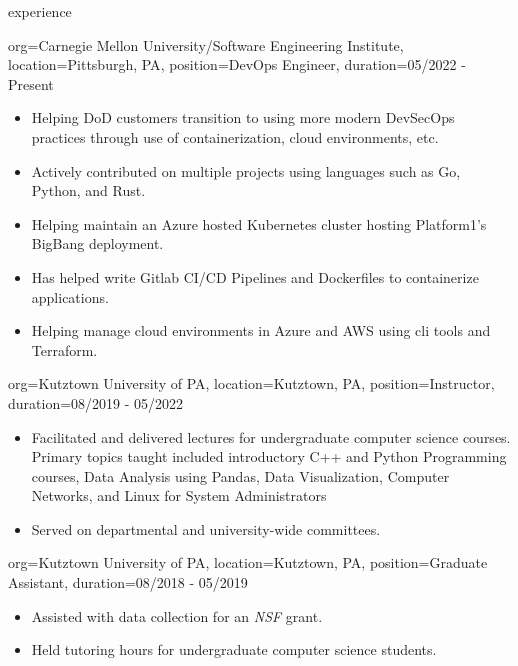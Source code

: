 \documentclass{resume}
\begin{document}
\makeheader

\begin{ResumeSection}{experience}
    \begin{ResumeSubsection}{org={Carnegie Mellon University/Software Engineering Institute}, location={Pittsburgh, PA}, position={DevOps Engineer}, duration={05/2022 - Present}}
        \begin{itemize}
            \item Helping DoD customers transition to using more modern DevSecOps practices through use of containerization, cloud environments, etc.
            \item Actively contributed on multiple projects using languages such as Go, Python, and Rust. 
            \item Helping maintain an Azure hosted Kubernetes cluster hosting Platform1's BigBang deployment. 
            \item Has helped write Gitlab CI/CD Pipelines and Dockerfiles to containerize applications.
            \item Helping manage cloud environments in Azure and AWS using cli tools and Terraform. 
        \end{itemize}
    \end{ResumeSubsection}
    \begin{ResumeSubsection}{org={Kutztown University of PA}, location={Kutztown, PA}, position={Instructor}, duration={08/2019 - 05/2022}}
        \begin{itemize}
            \item Facilitated and delivered lectures for undergraduate computer science courses. Primary topics taught included
            introductory C++ and Python Programming courses, Data Analysis using Pandas, Data Visualization, Computer Networks,
            and Linux for System Administrators
            \item Served on departmental and university-wide committees.
        \end{itemize}
    \end{ResumeSubsection}    
    \begin{ResumeSubsection}{org={Kutztown University of PA}, location={Kutztown, PA}, position={Graduate Assistant}, duration={08/2018 - 05/2019}}
        \begin{itemize}
            \item Assisted with data collection for an \emph{NSF} grant.
            \item Held tutoring hours for undergraduate computer science students. 
        \end{itemize}
    \end{ResumeSubsection}
\end{ResumeSection}
\end{document}
